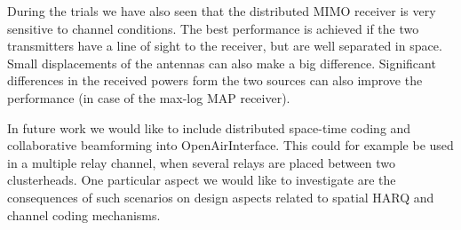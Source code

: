 \documentclass[a4paper,twocolumn,journal]{IEEEtran}
\begin{document}
During the trials we have also seen that the distributed MIMO receiver is very sensitive to channel conditions. The best performance is achieved if the two transmitters have a line of sight to the receiver, but are well separated in space. Small displacements of the antennas can also make a big difference. Significant differences in the received powers form the two sources can also improve the performance (in case of the max-log MAP receiver). 

In future work we would like to include distributed space-time coding and collaborative beamforming into OpenAirInterface. This could for example be used in a multiple relay channel, when several relays are placed between two clusterheads. One particular aspect we would like to investigate are the consequences of such scenarios on design aspects related to spatial HARQ and channel coding mechanisms.






\end{document}
